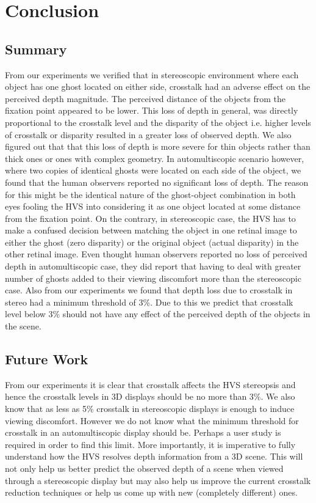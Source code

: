 \chapter{Conclusion}
\label{chap:Conclusion}

\section{Summary}

From our experiments we verified that in stereoscopic environment where each object has one ghost located on either side, crosstalk had an adverse effect on the perceived depth magnitude. The perceived distance of the objects from the fixation point appeared to be lower. This loss of depth in general, was directly proportional to the crosstalk level and the disparity of the object i.e. higher levels of crosstalk or disparity resulted in a greater loss of observed depth. We also figured out that that this loss of depth is more severe for thin objects rather than thick ones or ones with complex geometry. In automultiscopic scenario however, where two copies of identical ghosts were located on each side of the object, we found that the human observers reported no significant loss of depth. The reason for this might be the identical nature of the ghost-object combination in both eyes fooling the HVS into considering it as one object located at some distance from the fixation point. On the contrary, in stereoscopic case, the HVS has to make a confused decision between matching the object in one retinal image to either the ghost (zero disparity) or the original object (actual disparity) in the other retinal image. Even thought human observers reported no loss of perceived depth in automultiscopic case, they did report that having to deal with greater number of ghosts added to their viewing discomfort more than the stereoscopic case. Also from our experiments we found that depth loss due to crosstalk in stereo had a minimum threshold of 3\%. Due to this we predict that crosstalk level below 3\% should not have any effect of the perceived depth of the objects in the scene.
\pagebreak
\section{Future Work}

From our experiments it is clear that crosstalk affects the HVS stereopsis and hence the crosstalk levels in 3D displays should be no more than 3\%. We also know that as less as 5\% crosstalk in stereoscopic displays is enough to induce viewing discomfort. However we do not know what the minimum threshold for crosstalk in an automultiscopic display should be. Perhaps a user study is required in order to find this limit. More importantly, it is imperative to fully understand how the HVS resolves depth information from a 3D scene. This will not only help us better predict the observed depth of a scene when viewed through a stereoscopic display but may also help us improve the current crosstalk reduction techniques or help us come up with new (completely different) ones.

